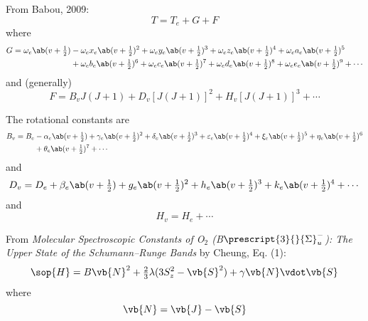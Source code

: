 \documentclass[11pt, twoside, fleqn]{report}
\newcommand{\state}[2]{\prescript{#1}{}{#2}}
\begin{document}
From Babou, 2009:
\begin{equation*}
    T = T_e + G + F
\end{equation*}
where
\begin{align*}
    G = \omega_e\ab(v + \tfrac{1}{2}) & - \omega_ex_e\ab(v + \tfrac{1}{2})^2 + \omega_ey_e\ab(v + \tfrac{1}{2})^3 + \omega_ez_e\ab(v + \tfrac{1}{2})^4 + \omega_ea_e\ab(v + \tfrac{1}{2})^5          \\
                                      & + \omega_eb_e\ab(v + \tfrac{1}{2})^6 + \omega_ec_e\ab(v + \tfrac{1}{2})^7 + \omega_ed_e\ab(v + \tfrac{1}{2})^8 + \omega_ee_e\ab(v + \tfrac{1}{2})^9 + \dotsb
\end{align*}
and (generally)
\begin{equation*}
    F = B_vJ(J + 1) + D_v[J(J + 1)]^2 + H_v[J(J + 1)]^3 + \dotsb
\end{equation*}

The rotational constants are
\begin{align*}
    B_v = B_e & - \alpha_e\ab(v + \tfrac{1}{2}) + \gamma_e\ab(v + \tfrac{1}{2})^2 + \delta_e\ab(v + \tfrac{1}{2})^3 + \varepsilon_e\ab(v + \tfrac{1}{2})^4 + \xi_e\ab(v + \tfrac{1}{2})^5 + \eta_e\ab(v + \tfrac{1}{2})^6 \\
              & + \theta_e\ab(v + \tfrac{1}{2})^7 + \dotsb
\end{align*}
and
\begin{equation*}
    D_v = D_e + \beta_e\ab(v + \tfrac{1}{2}) + g_e\ab(v + \tfrac{1}{2})^2 + h_e\ab(v + \tfrac{1}{2})^3 + k_e\ab(v + \tfrac{1}{2})^4 + \dotsb
\end{equation*}
and
\begin{equation*}
    H_v = H_e + \dotsb
\end{equation*}

From \textit{Molecular Spectroscopic Constants of O$_2$ (B$\state{3}{\Sigma}^-_u$): The Upper State of the Schumann--Runge Bands} by Cheung, Eq. (1):
\begin{equation*}
    \sop{H} = B\vb{N}^2 + \tfrac{2}{3}\lambda(3S_z^2 - \vb{S}^2) + \gamma\vb{N}\vdot\vb{S}
\end{equation*}
where
\begin{equation*}
    \vb{N} = \vb{J} - \vb{S}
\end{equation*}
\end{document}
